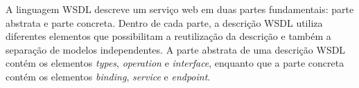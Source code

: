 



A linguagem WSDL descreve um serviço web em duas partes fundamentais: parte abstrata e parte concreta. Dentro de cada parte, a descrição WSDL utiliza diferentes elementos que possibilitam a reutilização da descrição e também a separação de modelos independentes. A parte abstrata de uma descrição WSDL contém os elementos \textit{types}, \textit{operation} e \textit{interface}, enquanto que a parte concreta contém os elementos \textit{binding}, \textit{service} e \textit{endpoint}.


